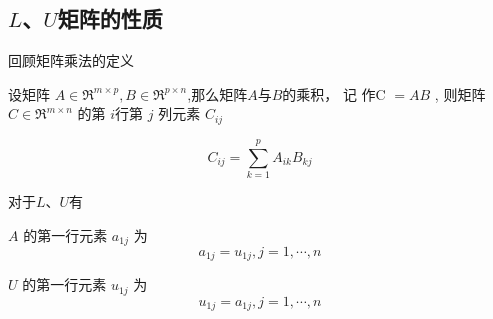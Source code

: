 \subsection{$L$、$U$矩阵的性质}

回顾矩阵乘法的定义

\begin{definition}[矩阵乘法]
    设矩阵 $ A \in \mathfrak{R}^{m \times p}, B \in \mathfrak{R}^{p \times n} $,那么矩阵$A$与$B$的乘积， 记 作C $ =A B $ ,  则矩阵 $ C \in \mathfrak{R}^{m \times n} $ 的第 $i$行第 $ j $ 列元素 $ C_{i j} $


    \begin{equation}
{C}_{i j}=\sum_{k=1}^{p} A_{i k} B_{k j}
\end{equation}
\end{definition}

对于$L$、$U$有

\begin{theorem}
    $ A $ 的第一行元素 $ a_{1 j} $ 为
    \begin{equation}
        a_{1 j}=u_{1 j}, j=1, \cdots, n
    \end{equation}
\end{theorem}

\begin{corollary}
    $ U $ 的第一行元素 $ u_{1 j} $ 为
    \begin{equation}
        u_{1 j}=a_{1 j}, j=1, \cdots, n
    \end{equation}
\end{corollary}

